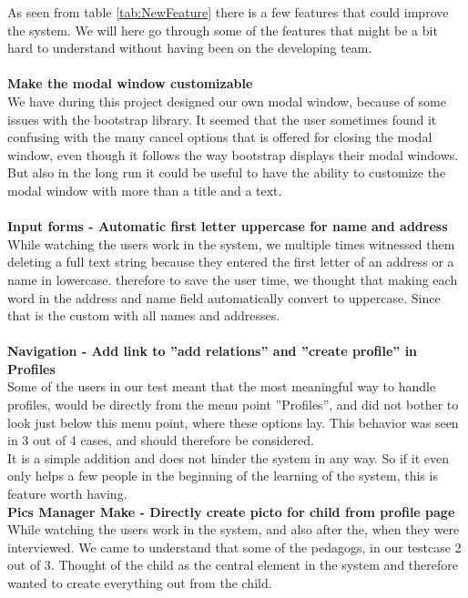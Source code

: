 As seen from table \ref{tab:NewFeature} there is a few features that could improve the system. We will here go through some of the features that might be a bit hard to understand without having been on the developing team.\\
\\
\textbf{Make the modal window customizable}\\
We have during this project designed our own modal window, because of some issues with the bootstrap library. It seemed that the user sometimes found it confusing with the many cancel options that is offered for closing the modal window, even though it follows the way bootstrap displays their modal windows.\\
But also in the long run it could be useful to have the ability to customize the modal window with more than a title and a text.\\
\\
\textbf{Input forms - Automatic first letter uppercase for name and address}\\
While watching the users work in the system, we multiple times witnessed them deleting a full text string because they entered the first letter of an address or a name in lowercase. therefore to save the user time, we thought that making each word in the address and name field automatically convert to uppercase. Since that is the custom with all names and addresses.\\
\\
\textbf{Navigation - Add link to ''add relations'' and ''create profile'' in Profiles}\\
Some of the users in our test meant that the most meaningful way to handle profiles, would be directly from the menu point ''Profiles'', and did not bother to look just below this menu point, where these options lay. This behavior was seen in 3 out of 4 cases, and should therefore be considered.\\
It is a simple addition and does not hinder the system in any way. So if it even only helps a few people in the beginning of the learning of the system, this is feature worth having.
\\
\textbf{Pics Manager Make - Directly create picto for child from profile page}\\
While watching the users work in the system, and also after the, when they were interviewed. We came to understand that some of the pedagogs, in our testcase 2 out of 3. Thought of the child as the central element in the system and therefore wanted to create everything out from the child.\\
